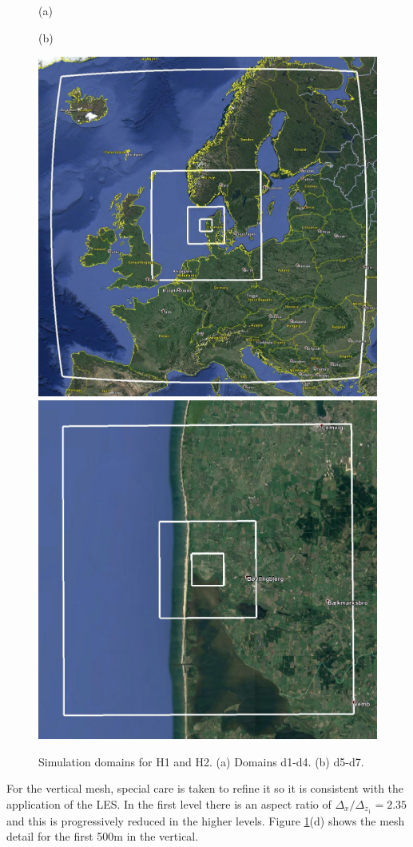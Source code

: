\begin{figure}
	\centering
	\begin{minipage}{0.5\linewidth}
		\center \hspace{2.8cm}(a)
	\end{minipage}%
	\begin{minipage}{0.5\linewidth}
		\center\hspace{-2.8cm}(b)
	\end{minipage}%
	
	\includegraphics[width=0.3\linewidth,trim={0cm 0cm -0cm 0cm},clip,frame]{Imagenes/05/hov_dom1_edit.jpg}\hspace{0.5cm}%
	\includegraphics[width=0.3\linewidth,trim={0cm 0cm 0cm 0cm},clip,frame]{Imagenes/05/hov_dom2_edit.jpg}\vspace{0.3cm}%
	
	\caption{Simulation domains for H1 and H2. (a) Domains d1-d4. (b) d5-d7.}
	\label{fig:05_dom_hov}
\end{figure}

For the vertical mesh, special care is taken to refine it so it is consistent with the application of the LES. In the first level there is an aspect ratio of $\Delta_x/\Delta_{z_1}=2.35$ and this is progressively reduced in the higher levels. Figure \ref{fig:05_dom_hov}(d) shows the mesh detail for the first 500m in the vertical.

